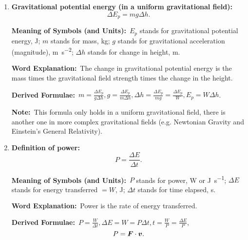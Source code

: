 \documentclass[8pt]{article}
\newcommand{\MeanSymb}{\textbf{Meaning of Symbols (and Units):}\ }
\newcommand{\WordExpl}{\textbf{Word Explanation:}\ }
\newcommand{\DeriForm}{\textbf{Derived Formulae:}\ }
\newcommand{\Note}{\textbf{Note:}\ }
\begin{document}
\begin{enumerate}
                \MeanSymb \(E_k\) stands for kinetic energy, \unit{\joule}; \(m\) stands for mass, \unit{\kilogram}; \(v\) stands for speed or magnitude of velocity, \unit{\metre\per\second}.

                \WordExpl The kinetic energy is half the mass times energy squared.
                
                \DeriForm \(v = \sqrt{\frac{2 E_k}{m}}\).

                \Note Energy is always a scalar. It makes no difference using speed or dot product of velocity here. Note that \(\Delta E_k \neq \frac{1}{2} m \Delta v^2\).

                \item \textbf{Gravitational potential energy (in a uniform gravitational field):}
                \[
                    \Delta E_p = m g \Delta h.
                \]

                \MeanSymb \(E_p\) stands for gravitational potential energy, \unit{\joule}; \(m\) stands for mass, \unit{\kilogram}; \(g\) stands for gravitational acceleration (magnitude), \unit{\metre\per\second\squared}; \(\Delta h\) stands for change in height, \unit{\metre}.

                \WordExpl The change in gravitational potential energy is the mass times the gravitational field strength times the change in the height.

                \DeriForm \(m = \frac{\Delta E_p}{g \Delta h}, g = \frac{\Delta E_p}{m \Delta h}, \Delta h = \frac{\Delta E_p}{mg} = \frac{\Delta E_p}{W}, E_p = W \Delta h\).

                \Note This formula only holds in a uniform gravitational field, there is another one in more complex gravitational fields (e.g. Newtonian Gravity and Einstein's General Relativity).

                \item \textbf{Definition of power:}
                \[
                    P = \frac{\Delta E}{\Delta t}.
                \]

                \MeanSymb \(P\) stands for power, \unit{\watt} or \unit{\joule\per\second}; \(\Delta E\) stands for energy transferred \(= W\), \unit{\joule}; \(\Delta t\) stands for time elapsed, \unit{\second}.

                \WordExpl Power is the rate of energy transferred.

                \DeriForm \(P = \frac{W}{\Delta t}, \Delta E = W = P \Delta t, t = \frac{W}{P} = \frac{\Delta E}{P}\),
                \[
                    P = \boldsymbol{F} \cdot \boldsymbol{v}.
                \]


\end{enumerate}
\end{document}
